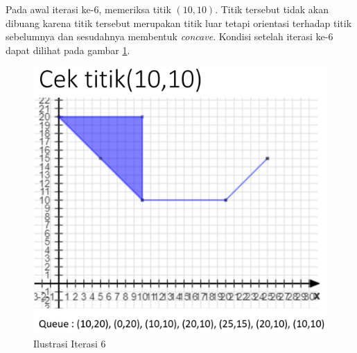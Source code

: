 \par Pada awal iterasi ke-6, memeriksa titik $(10,10)$. Titik tersebut tidak akan dibuang karena titik tersebut merupakan titik luar tetapi orientasi terhadap titik sebelumnya dan sesudahnya membentuk \textit{concave}. Kondisi setelah iterasi ke-6 dapat dilihat pada gambar \ref{fig:iterasi-6}.
\begin{figure}[!h]
	\Centering
	\includegraphics [width=\columnwidth]{bab5/img/iterasi-6}
	\caption {Ilustrasi Iterasi 6}
	\label {fig:iterasi-6}
\end{figure}

